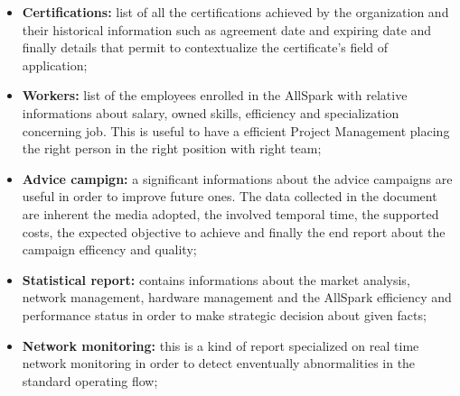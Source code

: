 \begin{itemize}
  \item {\bf Certifications:} list of all the certifications achieved by the organization and their historical information such as agreement date and expiring date and finally details that permit to contextualize the certificate's field of application;
  \item {\bf Workers:} list of the employees enrolled in the AllSpark with relative informations about salary, owned skills, efficiency and specialization concerning job. This is useful to have a efficient Project Management placing the right person in the right position with right team;
  \item {\bf Advice campign:} a significant informations about the advice campaigns are useful in order to improve future ones. The data collected in the document are inherent the media adopted, the involved temporal time, the supported costs, the expected objective to achieve and finally the end report about the campaign efficency and quality;
  \item {\bf Statistical report:} contains informations about the market analysis, network management, hardware management and the AllSpark efficiency and performance status in order to make strategic decision about given facts;
  \item {\bf Network monitoring:} this is a kind of report specialized on real time network monitoring in order to detect enventually abnormalities in the standard operating flow;
\end{itemize}

